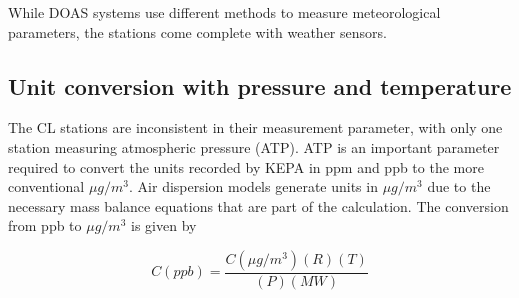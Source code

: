 While DOAS systems use different methods to measure meteorological parameters, the stations come complete with weather sensors. 

\subsection{Unit conversion with pressure and temperature}
The CL stations are inconsistent in their measurement parameter, with only one station measuring atmospheric pressure (ATP). ATP is an important parameter required to convert the units recorded by KEPA in ppm and ppb to the more conventional $\mu g/m^{3}$. Air dispersion models generate units in $\mu g/m^{3}$ due to the necessary mass balance equations that are part of the calculation. The conversion from ppb to  $\mu g/m^{3}$ is given by 

%
\begin{equation}
\label{eq:gasequation}
C(ppb) = \frac{C(\mu g/m^{3})(R) (T)}{(P) (MW)}
\end{equation}
%

